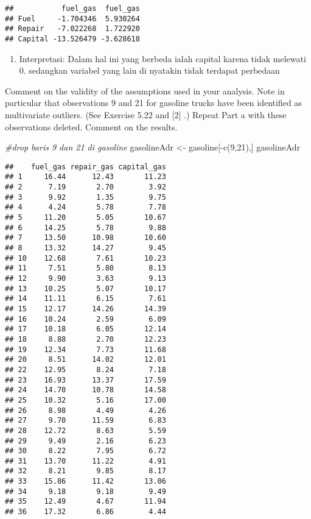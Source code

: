 \documentclass[
]{article}
\newenvironment{Shaded}{\begin{snugshade}}{\end{snugshade}}
\newcommand{\CommentTok}[1]{\textcolor[rgb]{0.56,0.35,0.01}{\textit{#1}}}
\newcommand{\DecValTok}[1]{\textcolor[rgb]{0.00,0.00,0.81}{#1}}
\newcommand{\FunctionTok}[1]{\textcolor[rgb]{0.00,0.00,0.00}{#1}}
\newcommand{\NormalTok}[1]{#1}
\newcommand{\OtherTok}[1]{\textcolor[rgb]{0.56,0.35,0.01}{#1}}
\newcommand{\SpecialCharTok}[1]{\textcolor[rgb]{0.00,0.00,0.00}{#1}}
\providecommand{\tightlist}{%
  \setlength{\itemsep}{0pt}\setlength{\parskip}{0pt}}
\begin{document}
\begin{verbatim}
##           fuel_gas  fuel_gas
## Fuel     -1.704346  5.930264
## Repair   -7.022268  1.722920
## Capital -13.526479 -3.628618
\end{verbatim}

\begin{enumerate}
\def\labelenumi{\alph{enumi}.}
\setcounter{enumi}{2}
\tightlist
\item
  Interpretasi: Dalam hal ini yang berbeda ialah capital karena tidak
  melewati 0. sedangkan variabel yang lain di nyatakin tidak terdapat
  perbedaan
\end{enumerate}

Comment on the validity of the assumptions used in your analysis. Note
in particular that observations 9 and 21 for gasoline trucks have been
identified as multivariate outliers. (See Exercise 5.22 and {[}2{]} .)
Repeat Part a with these observations deleted. Comment on the results.

\begin{Shaded}
\begin{Highlighting}[]
\CommentTok{\#drop baris 9 dan 21 di gasoline }
\NormalTok{gasolineAdr }\OtherTok{\textless{}{-}}\NormalTok{ gasoline[}\SpecialCharTok{{-}}\FunctionTok{c}\NormalTok{(}\DecValTok{9}\NormalTok{,}\DecValTok{21}\NormalTok{),]}
\NormalTok{gasolineAdr}
\end{Highlighting}
\end{Shaded}

\begin{verbatim}
##    fuel_gas repair_gas capital_gas
## 1     16.44      12.43       11.23
## 2      7.19       2.70        3.92
## 3      9.92       1.35        9.75
## 4      4.24       5.78        7.78
## 5     11.20       5.05       10.67
## 6     14.25       5.78        9.88
## 7     13.50      10.98       10.60
## 8     13.32      14.27        9.45
## 10    12.68       7.61       10.23
## 11     7.51       5.80        8.13
## 12     9.90       3.63        9.13
## 13    10.25       5.07       10.17
## 14    11.11       6.15        7.61
## 15    12.17      14.26       14.39
## 16    10.24       2.59        6.09
## 17    10.18       6.05       12.14
## 18     8.88       2.70       12.23
## 19    12.34       7.73       11.68
## 20     8.51      14.02       12.01
## 22    12.95       8.24        7.18
## 23    16.93      13.37       17.59
## 24    14.70      10.78       14.58
## 25    10.32       5.16       17.00
## 26     8.98       4.49        4.26
## 27     9.70      11.59        6.83
## 28    12.72       8.63        5.59
## 29     9.49       2.16        6.23
## 30     8.22       7.95        6.72
## 31    13.70      11.22        4.91
## 32     8.21       9.85        8.17
## 33    15.86      11.42       13.06
## 34     9.18       9.18        9.49
## 35    12.49       4.67       11.94
## 36    17.32       6.86        4.44
\end{verbatim}
\end{document}
